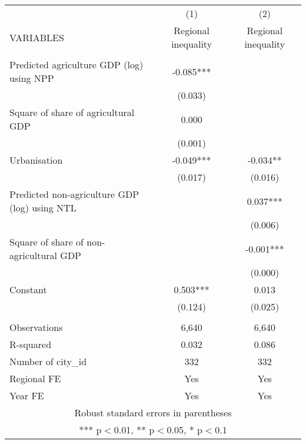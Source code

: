 \documentclass[]{article}
\begin{document}
\begin{tabular}{lcc} \hline
 & (1) & (2) \\
VARIABLES & Regional inequality & Regional inequality \\ \hline
 &  &  \\
Predicted agriculture GDP (log) using NPP & -0.085*** &  \\
 & (0.033) &  \\
Square of share of agricultural GDP & 0.000 &  \\
 & (0.001) &  \\
Urbanisation & -0.049*** & -0.034** \\
 & (0.017) & (0.016) \\
Predicted non-agriculture GDP (log) using NTL &  & 0.037*** \\
 &  & (0.006) \\
Square of share of non-agricultural GDP &  & -0.001*** \\
 &  & (0.000) \\
Constant & 0.503*** & 0.013 \\
 & (0.124) & (0.025) \\
 &  &  \\
Observations & 6,640 & 6,640 \\
R-squared & 0.032 & 0.086 \\
Number of city\_id & 332 & 332 \\
Regional FE & Yes & Yes \\
 Year FE & Yes & Yes \\ \hline
\multicolumn{3}{c}{ Robust standard errors in parentheses} \\
\multicolumn{3}{c}{ *** p$<$0.01, ** p$<$0.05, * p$<$0.1} \\
\end{tabular}
\end{document}
